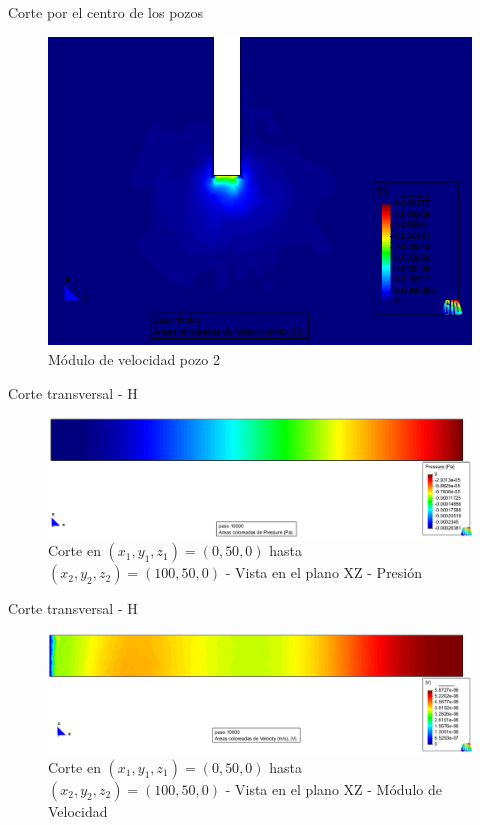 \documentclass[spanish]{beamer}
\begin{document}
%
\begin{frame}{Corte por el centro de los pozos}
\begin{center}
\begin{figure}[htbp]
\centerline{\includegraphics[scale=0.25]{../img/200m/resul/200_XZ_velocidad_corte_centro_pozo2}}
\caption{Módulo de velocidad pozo 2}
\end{figure}
\end{center}
\end{frame}
%
\begin{frame}{Corte transversal - H}
\begin{center}
\begin{figure}[htbp]
\centerline{\includegraphics[scale=0.25]{../img/200m/resul/200_XZ_presion_corte_horizontal}}
\caption{Corte en $(x_1,y_1,z_1)=(0,50,0)$ hasta $(x_2,y_2,z_2)=(100,50,0)$ - Vista en el plano XZ - Presión}
\end{figure}
\end{center}
\end{frame}
%
\begin{frame}{Corte transversal - H}
\begin{center}
\begin{figure}[htbp]
\centerline{\includegraphics[scale=0.25]{../img/200m/resul/200_XZ_velocidad_corte_horizontal}}
\caption{Corte en $(x_1,y_1,z_1)=(0,50,0)$ hasta $(x_2,y_2,z_2)=(100,50,0)$ - Vista en el plano XZ - Módulo de Velocidad}
\end{figure}
\end{center}
\end{frame}
\end{document}
